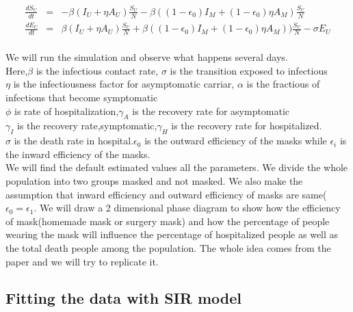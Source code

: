 \documentclass{article}
\begin{document}
\begin{minipage}{0.35\textwidth}
\small
\begin{eqnarray}
  \frac{dS_{U}}{dt} &=& -\beta(I_{U}+\eta A_{U})\frac{S_{U}}{N}-\beta((1-\epsilon_{0})I_{M}+(1-\epsilon_{0})\eta A_{M})\frac{S_{U}}{N}\nonumber\\
  \frac{dE_{U}}{dt} &=& \beta(I_{U}+\eta{A}_{U})\frac{S_{U}}{N}+\beta((1-\epsilon_{0})I_{M}+(1-\epsilon_{0})\eta A_{M}))\frac{S_{U}}{N}-\sigma E_{U}\nonumber\\
  \end{eqnarray}
\end{minipage}

We will run the simulation and observe what happens several days. \\Here,$\beta$ is the infectious contact rate, $\sigma$ is the transition exposed to infectious\\$\eta$ is the infectiousness factor for asymptomatic carriar, $\alpha$ is the fractious of infections that become symptomatic\\
$\phi$ is rate of hospitalization,$\gamma_{A}$ is the recovery rate for asymptomatic
\\$\gamma_{I}$ is the recovery rate,symptomatic,$\gamma_{H}$ is the recovery rate for hospitalized.\\$\sigma$ is the death rate in hospital.$\epsilon_{0}$ is the outward efficiency of the masks while $\epsilon_{i}$ is the inward efficiency of the masks.\\

We will find the default estimated values all the parameters. We divide the whole population into two groups masked and not masked.
We also make the assumption that inward efficiency and outward efficiency of masks are same($\epsilon_{0} = \epsilon_{1}$. We will draw a 2 dimensional phase diagram to show how the efficiency of mask(homemade mask or surgery mask) and how the percentage of people wearing the mask will influence the percentage of hospitalized people as well as the total death people among the population. The whole idea comes from the paper and we will try to replicate it.


\subsection{Fitting the data with SIR model}
\end{document}
